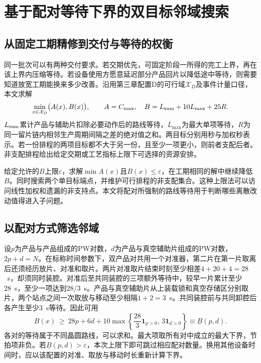 \section{基于配对等待下界的双目标邻域搜索}\label{sec:third-innovation}

\subsection{从固定工期精修到交付与等待的权衡}

同一批次可以有两种交付要求。若交期优先，可固定阶段一所得的完工上界，再在该上界内压缩等待。若设备使用方愿意延迟部分产品回片以降低途中等待，则需要知道放宽工期能换来多少改善。沿用第三章配置D的可行域$\mathcal X_D$及事件计量口径，本文求解
\begin{equation}
 \min_{x\in\mathcal X_D}\bigl(A(x),B(x)\bigr),\qquad
 A=C_{\max},\quad B=L_{\rm sum}+10L_{\max}+25R .
 \label{eq:pareto-ab}
\end{equation}
$L_{\rm sum}$累计产品与辅助片扣除必要动作后的路线等待，$L_{\max}$为最大单项等待，$R$为同一留片链内相邻生产周期间隔之差的绝对值之和。两目标分别用秒与加权秒表示。若一份排程的两项目标都不大于另一份，且至少一项更小，则前者支配后者。非支配排程给出给定交期或工艺指标上限下可选择的资源安排。\par

给定允许的$B$上限$\varepsilon$，求解$\min A(x)$且$B(x)\le\varepsilon$，在工期相同的解中继续降低$B$。同时搜索两个单目标端点，并维护可行排程的非支配集合。这种上限法可以访问线性加权和遗漏的非支持点\citep{mavrotas2009}。本文将配对所强制的路线等待用于判断哪些离散改动值得进入子问题。

\subsection{以配对方式筛选邻域}

设$p$为产品与产品组成的PW对数，$d$为产品与真空辅助片组成的PW对数，$2p+d=N$。在标称时间参数下，双产品对共用一个对准器，第二片在第一片取离后还须经历放片、对准和取片。两片对准取片结束时刻至少相差$4+20+4=28$~s，却须同时装腔。对准后至共同装腔的三项额外等待中，较早一片累计至少28~s，至少一项达到$28/3$~s。产品与真空辅助片从上装载锁和真空存储区分别取片，两个站点之间一次取放与移动至少相隔$1+2=3$~s。共同装腔前与共同卸腔后各产生至少3~s等待。因此可用
\begin{equation}
 B(x)\ \ge\ 28p+6d+
 10\max\!\left\{\frac{28}{3}\mathbf{1}_{p>0},\,3\mathbf{1}_{d>0}\right\}
 \equiv \underline B(p,d).
 \label{eq:pareto-pair-bound}
\end{equation}
各对的等待属于不同晶圆路线，可以求和。最大项取所有对中成立的最大下界，节拍项非负。若$\underline B(p,d)>\varepsilon$，本次上限下即可跳过相应配对数量。换用其他设备时间时，应以该配置的对准、取放与移动时长重新计算下界。

